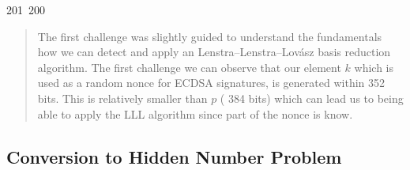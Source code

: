 201~200~\documentclass{article}
\begin{document}
	                                                                        	                                                                    	                                	                    	                    	                        	                        	                    	                                                                	                	                                                                    	                    \begin{abstract}
	                                                                        	                                                                    	                                	                    	                    	                        	                        	                    	                                                                	                	                                                                    	                    The first challenge was slightly guided to understand the fundamentals how we can detect and apply an Lenstra–Lenstra–Lovász basis reduction algorithm. The first challenge we can observe that our element $k$ which is used as a random nonce for ECDSA signatures, is generated within 352 bits. This is relatively smaller than $p$ ( 384 bits) which can lead us to being able to apply the LLL algorithm since part of the nonce is know.
	                                                                        	                                                                    	                                	                    	                    	                        	                        	                    	                                                                	                	                                                                    	                    \end{abstract}


	                                                                        	                                                                    	                                	                    	                    	                        	                        	                    	                                                                	                	                                                                    	                    \subsection{Conversion to Hidden Number Problem}
\end{document}
